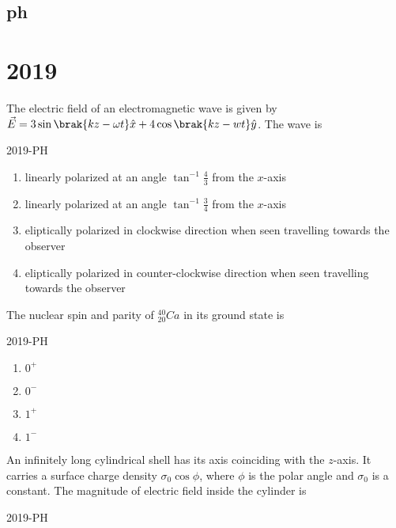 \ifflase
\section{ph}
\chapter{2019}
\author{ai24btech11036}
\fi


\item The electric field of an electromagnetic wave is given by $\vec{E}=3 \sin \brak{kz-\omega t}\hat{x} + 4 \cos \brak{kz-wt}\hat{y}$. The wave is

\hfill{2019-PH}
	\begin{enumerate}
	\item linearly polarized at an angle $\tan ^{-1} \frac{4}{3}$ from the $x$-axis
	\item linearly polarized at an angle $\tan ^{-1} \frac{3}{4}$ from the $x$-axis
	\item eliptically polarized in clockwise direction when seen travelling towards the observer
	\item eliptically polarized in counter-clockwise direction when seen travelling towards the observer
	\end{enumerate}

\item The nuclear spin and parity of $^{40} _{20} Ca$ in its ground state is

\hfill{2019-PH}

	\begin{enumerate}
	\item $0^{+}$
	\item $0^{-}$
	\item $1^{+}$
	\item $1^{-}$
	\end{enumerate}

\item An infinitely long cylindrical shell has its axis coinciding with the $z$-axis. It carries a surface charge density $\sigma_{0} \cos \phi$, where $\phi$ is the polar angle and $\sigma_{0}$ is a constant. The magnitude of electric field inside the cylinder is

\hfill{2019-PH}

